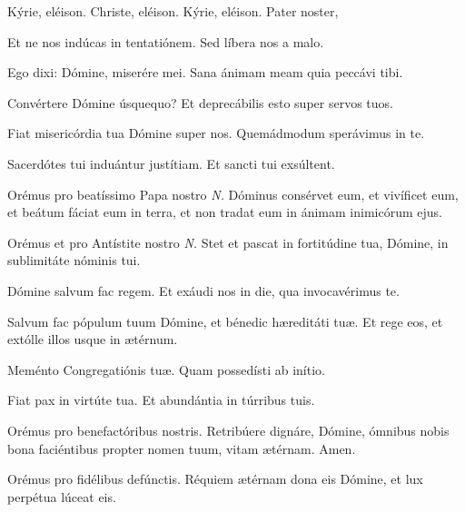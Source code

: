 
\label{preces}Kýrie, eléison. Christe, eléison. Kýrie, eléison. Pater noster, 


\vv Et ne nos indúcas in tentatiónem. \rr Sed líbera nos a malo.

\vv Ego dixi: Dómine, miserére mei. \rr Sana ánimam meam quia peccávi tibi.

\vv Convértere Dómine úsquequo?
\rr Et deprecábilis esto super servos tuos.

\vv Fiat misericórdia tua Dómine super nos.
\rr Quemádmodum sperávimus in te.

\vv Sacerdótes tui induántur justítiam.
\rr Et sancti tui exsúltent.

\vv Orémus pro beatíssimo Papa nostro \textit{N.}
\rr Dóminus consérvet eum, et vivíficet eum, et beátum fáciat eum in terra, et non tradat eum in ánimam inimicórum ejus.

\vv Orémus et pro Antístite nostro \textit{N.}
\rr Stet et pascat in fortitúdine tua, Dómine, in sublimitáte nóminis tui.


\vv Dómine salvum fac regem.
\rr Et exáudi nos in die, qua invocavérimus te.

\vv Salvum fac pópulum tuum Dómine, et bénedic hæreditáti tuæ.
\rr Et rege eos, et extólle illos usque in ætérnum.

\vv Meménto Congregatiónis tuæ.
\rr Quam possedísti ab inítio.

\vv Fiat pax in virtúte tua.
\rr Et abundántia in túrribus tuis.

\vv Orémus pro benefactóribus nostris.
\rr Retribúere dignáre, Dómine, ómnibus nobis bona faciéntibus propter nomen tuum, vitam ætérnam. Amen.

\vv Orémus pro fidélibus defúnctis.
\rr Réquiem ætérnam dona eis Dómine, et lux perpétua lúceat eis.

